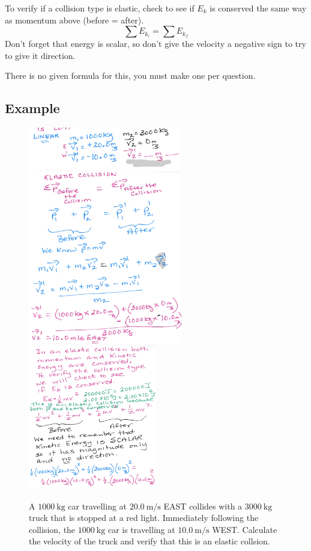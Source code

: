 \documentclass[a4paper,12pt]{article}
\begin{document}
To verify if a collision type is elastic, check to see if $E_k$ is conserved the same way as momentum above (before = after).
$$\sum E_{k_i} = \sum E_{k_f}$$
Don't forget that energy is scalar, so don't give the velocity a negative sign to try to give it direction.

There is no given formula for this, you must make one per question.

\subsection{Example}
\begin{figure}[H]
    \caption{A $\SI{1000}{\kg}$ car travelling at $\SI{20.0}{\m\per\s}$ EAST collides with a $\SI{3000}{\kg}$ truck that is stopped at a red light. Immediately following the collision, the $\SI{1000}{\kg}$ car is travelling at $\SI{10.0}{\m\per\s}$ WEST. Calculate the velocity of the truck and verify that this is an elastic collsion.}
    \includegraphics[width=0.6\textwidth]{q-elastic-1a}
    \includegraphics[width=0.6\textwidth]{q-elastic-1b}
    \includegraphics[width=0.5\textwidth]{q-elastic-1c}
    \centering
\end{figure}
\end{document}

